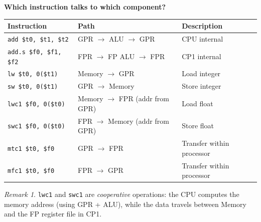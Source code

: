 \documentclass{article}
\theoremstyle{remark}
\newtheorem*{remark}{Remark}
\newenvironment{sub}{%
  \begin{list}{}{%
    \setlength{\leftmargin}{4em}%
    \setlength{\rightmargin}{0pt}%
    \setlength{\topsep}{0pt}%
    \setlength{\partopsep}{0pt}%
    \setlength{\parsep}{\parskip}%
    \setlength{\itemsep}{\parskip}%
  }\item\relax
}{\end{list}}
\begin{document}
\begin{sub}
\begin{center}
\end{center}

\bigskip
\textbf{Which instruction talks to which component?}

\begin{center}
\begin{tabular}{lll}
\toprule
\textbf{Instruction} & \textbf{Path} & \textbf{Description} \\
\midrule
\texttt{add \$t0, \$t1, \$t2}
  & GPR $\to$ ALU $\to$ GPR
  & CPU internal \\
\texttt{add.s \$f0, \$f1, \$f2}
  & FPR $\to$ FP ALU $\to$ FPR
  & CP1 internal \\
\midrule
\texttt{lw \$t0, 0(\$t1)}
  & Memory $\to$ GPR
  & Load integer \\
\texttt{sw \$t0, 0(\$t1)}
  & GPR $\to$ Memory
  & Store integer \\
\texttt{lwc1 \$f0, 0(\$t0)}
  & Memory $\to$ FPR (addr from GPR)
  & Load float \\
\texttt{swc1 \$f0, 0(\$t0)}
  & FPR $\to$ Memory (addr from GPR)
  & Store float \\
\midrule
\texttt{mtc1 \$t0, \$f0}
  & GPR $\to$ FPR
  & Transfer within processor \\
\texttt{mfc1 \$t0, \$f0}
  & FPR $\to$ GPR
  & Transfer within processor \\
\bottomrule
\end{tabular}
\end{center}

\begin{remark}
\texttt{lwc1} and \texttt{swc1} are \emph{cooperative} operations:
the CPU computes the memory address (using GPR + ALU), while the data
travels between Memory and the FP register file in CP1.
\end{remark}
\end{sub}
\end{document}
